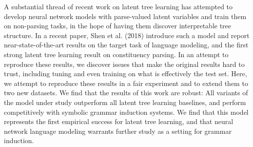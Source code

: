 A substantial thread of recent work on latent tree learning has attempted to develop neural network models with parse-valued latent variables and train them on non-parsing tasks, in the hope of having them discover interpretable tree structure. In a recent paper, Shen et al. (2018) introduce such a model and report near-state-of-the-art results on the target task of language modeling, and the first strong latent tree learning result on constituency parsing. In an attempt to reproduce these results, we discover issues that make the original results hard to trust, including tuning and even training on what is effectively the test set. Here, we attempt to reproduce these results in a fair experiment and to extend them to two new datasets. We find that the results of this work are robust: All variants of the model under study outperform all latent tree learning baselines, and perform competitively with symbolic grammar induction systems. We find that this model represents the first empirical success for latent tree learning, and that neural network language modeling warrants further study as a setting for grammar induction.
